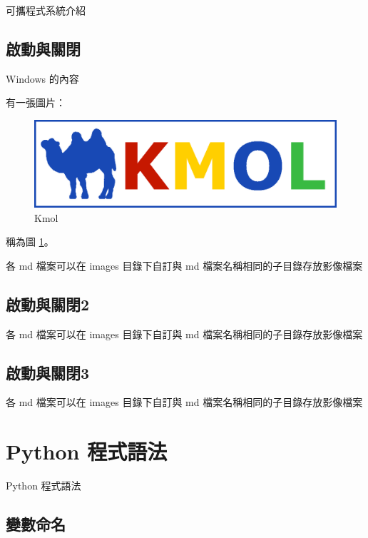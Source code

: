 \documentclass[12pt,,]{report}
\begin{document}
可攜程式系統介紹

\hypertarget{ux555fux52d5ux8207ux95dcux9589}{%
\section{啟動與關閉}\label{ux555fux52d5ux8207ux95dcux9589}}

Windows 的內容

有一張圖片：

\begin{figure}
\centering
\includegraphics{./tex2pdf.6656/e0ef408d9559203849a0aa26f79f9b032b709c7a.png}
\caption{Kmol\label{fig:駱駝}}
\end{figure}

稱為圖 \ref{fig:駱駝}。

各 md 檔案可以在 images 目錄下自訂與 md 檔案名稱相同的子目錄存放影像檔案

\hypertarget{ux555fux52d5ux8207ux95dcux95892}{%
\section{啟動與關閉2}\label{ux555fux52d5ux8207ux95dcux95892}}

各 md 檔案可以在 images 目錄下自訂與 md 檔案名稱相同的子目錄存放影像檔案

\hypertarget{ux555fux52d5ux8207ux95dcux95893}{%
\section{啟動與關閉3}\label{ux555fux52d5ux8207ux95dcux95893}}

各 md 檔案可以在 images 目錄下自訂與 md 檔案名稱相同的子目錄存放影像檔案

\hypertarget{python-ux7a0bux5f0fux8a9eux6cd5}{%
\chapter{Python 程式語法}\label{python-ux7a0bux5f0fux8a9eux6cd5}}

Python 程式語法

\hypertarget{ux8b8aux6578ux547dux540d}{%
\section{變數命名}\label{ux8b8aux6578ux547dux540d}}
\end{document}
